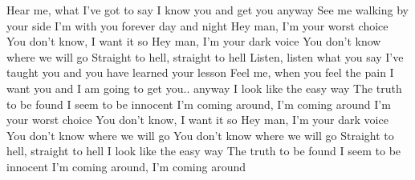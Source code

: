 
\beginverse
Hear me, what I've got to say
I know you and get you anyway
See me walking by your side
I'm with you forever day and night
\endverse
\beginchorus
Hey man, I'm your worst choice
You don't know, I want it so
Hey man, I'm your dark voice
You don't know where we will go
Straight to hell, straight to hell
\endchorus
\beginverse
Listen, listen what you say
I've taught you and you have learned your lesson
Feel me, when you feel the pain
I want you and I am going to get you.. anyway
\endverse
\beginverse*
I look like the easy way
The truth to be found
I seem to be innocent
I'm coming around, I'm coming around
\endverse
\beginchorus
I'm your worst choice
You don't know, I want it so
Hey man, I'm your dark voice
You don't know where we will go
You don't know where we will go
Straight to hell, straight to hell
\endchorus
\beginverse*
I look like the easy way
The truth to be found
I seem to be innocent
I'm coming around, I'm coming around
\endverse
{}
\endsong
